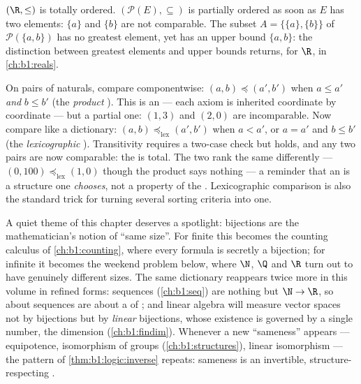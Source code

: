 \begin{example}\label{ex:b1:logic:orders}
$(\R, \leq)$ is totally ordered. $(\mathcal{P}(E), \subseteq)$ is
partially ordered as soon as $E$ has two elements: $\{a\}$ and
$\{b\}$ are not comparable. The subset $A = \{\{a\}, \{b\}\}$ of
$\mathcal{P}(\{a,b\})$ has no greatest element, yet has an upper bound
$\{a, b\}$: the distinction between greatest elements and upper bounds
returns, for $\R$, in \cref{ch:b1:reals}.
\end{example}

\begin{example}\label{ex:b1:logic:lexorder}
On pairs of naturals, compare componentwise: $(a, b) \preceq (a',
b')$ when $a \leq a'$ \emph{and} $b \leq b'$ (the \emph{product
}). This is an  --- each axiom is inherited coordinate
by coordinate --- but a partial one: $(1, 3)$ and $(2, 0)$ are
incomparable. Now compare like a dictionary: $(a, b)
\preceq_{\mathrm{lex}} (a', b')$ when $a < a'$, or $a = a'$ and $b
\leq b'$ (the \emph{lexicographic }). Transitivity requires
a two-case check but holds, and any two pairs are now comparable:
the  is total. The two  rank the same  differently
--- $(0, 100) \preceq_{\mathrm{lex}} (1, 0)$ though the product
 says nothing --- a reminder that an  is a structure
one \emph{chooses}, not a property of the . Lexicographic
comparison is also the standard trick for turning several sorting
criteria into one.
\end{example}

\begin{remark}\label{rem:b1:logic:interlude}
A quiet theme of this chapter deserves a spotlight: bijections are
the mathematician's notion of ``same size''. For finite  this
becomes the counting calculus of \cref{ch:b1:counting}, where
every formula is secretly a bijection; for infinite  it
becomes the weekend problem below, where $\N$, $\Q$ and $\R$ turn
out to have genuinely different sizes. The same dictionary
reappears twice more in this volume in refined forms: sequences
(\cref{ch:b1:seq}) are nothing but  $\N \to \R$, so 
about sequences are  about a  of ; and linear
algebra will measure vector spaces not by bijections but by
\emph{linear} bijections, whose existence is governed by a single
number, the dimension (\cref{ch:b1:findim}). Whenever a new
``sameness'' appears --- equipotence, isomorphism of groups
(\cref{ch:b1:structures}), linear isomorphism --- the pattern of
\cref{thm:b1:logic:inverse} repeats: sameness is an invertible,
structure-respecting .
\end{remark}

